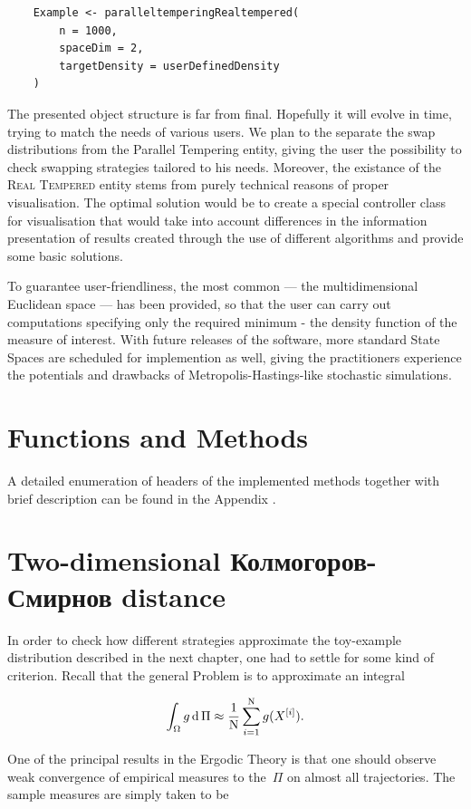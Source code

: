 \documentclass{book}
\begin{document}
\begin{lstlisting}
	Example <- paralleltemperingRealtempered(
		n = 1000,
		spaceDim = 2,
		targetDensity = userDefinedDensity
	)
\end{lstlisting}

The presented object structure is far from final. Hopefully it will evolve in time, trying to match the needs of various users. We plan to the separate the swap distributions from the Parallel Tempering entity, giving the user the possibility to check swapping strategies tailored to his needs. Moreover, the existance of the \textsc{Real Tempered} entity stems from purely technical reasons of proper visualisation. The optimal solution would be to create a special controller class for visualisation that would take into account differences in the information presentation of results created through the use of different algorithms and provide some basic solutions.

To guarantee user-friendliness, the most common \sspace --- the multidimensional Euclidean space --- has been provided, so that the user can carry out computations specifying only the required minimum - the density function of the measure of interest. With future releases of the software, more standard State Spaces are scheduled for implemention as well, giving the practitioners experience the potentials and drawbacks of Metropolis-Hastings-like stochastic simulations.

\section{Functions and Methods}

A detailed enumeration of headers of the implemented methods together with brief description can be found in the Appendix .

\section{Two-dimensional Колмогоров-Смирнов distance}

In order to check how different strategies approximate the toy-example distribution described in the next chapter, one had to settle for some kind of criterion. Recall that the general Problem is to approximate an integral

$$\int_\Omega g \,\mathrm{d }\,\Pi \approx \frac{1}{\mathrm{N}}\sum_{i = 1}^{\mathrm{N}} g(X^{[i]}). $$

One of the principal results in the Ergodic Theory is that one should observe weak convergence of empirical measures to the \measure\,$\Pi$ on almost all trajectories. The sample measures are simply taken to be
\end{document}
